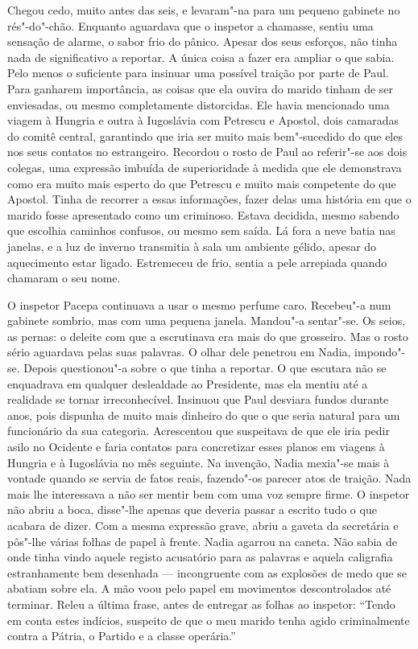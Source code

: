 Chegou cedo, muito antes das seis, e levaram"-na para um pequeno gabinete
no rés"-do"-chão. Enquanto aguardava que o inspetor a chamasse, sentiu
uma sensação de alarme, o sabor frio do pânico. Apesar dos seus
esforços, não tinha nada de significativo a reportar. A única coisa a
fazer era ampliar o que sabia. Pelo menos o suficiente para insinuar uma
possível traição por parte de Paul. Para ganharem importância, as coisas
que ela ouvira do marido tinham de ser enviesadas, ou mesmo
completamente distorcidas. Ele havia mencionado uma viagem à Hungria e
outra à Iugoslávia com Petrescu e Apostol, dois camaradas do comitê
central, garantindo que iria ser muito mais
bem"-sucedido do que eles nos seus contatos no estrangeiro. Recordou o
rosto de Paul ao referir"-se aos dois colegas, uma expressão imbuída de
superioridade à medida que ele demonstrava como era muito mais esperto
do que Petrescu e muito mais competente do que Apostol. Tinha de
recorrer a essas informações, fazer delas uma história em que o marido
fosse apresentado como um criminoso. Estava decidida, mesmo sabendo que
escolhia caminhos confusos, ou mesmo sem saída. Lá fora a neve batia nas
janelas, e a luz de inverno transmitia à sala um ambiente gélido, apesar
do aquecimento estar ligado. Estremeceu de frio, sentia a pele arrepiada
quando chamaram o seu nome.

O inspetor Pacepa continuava a usar o mesmo perfume caro. Recebeu"-a num gabinete sombrio, mas com uma pequena janela.
Mandou"-a sentar"-se. Os seios, as pernas: o deleite com que a escrutinava
era mais do que grosseiro. Mas o rosto sério aguardava pelas suas
palavras. O olhar dele penetrou em Nadia, impondo"-se. Depois
questionou"-a sobre o que tinha a reportar. O que escutara não se
enquadrava em qualquer deslealdade ao Presidente, mas ela mentiu até a
realidade se tornar irreconhecível. Insinuou que Paul desviara fundos
durante anos, pois dispunha de muito mais dinheiro do que o que seria
natural para um funcionário da sua categoria. Acrescentou que
suspeitava de que ele iria pedir asilo no Ocidente e faria contatos
para concretizar esses planos em viagens à Hungria e à Iugoslávia no
mês seguinte. Na invenção, Nadia mexia"-se mais à vontade quando se
servia de fatos reais, fazendo"-os parecer atos de traição. Nada mais
lhe interessava a não ser mentir bem com uma voz sempre firme. O inspetor não
abriu a boca, disse"-lhe apenas que deveria passar a escrito tudo o que
acabara de dizer. Com a mesma expressão grave, abriu a gaveta da
secretária e pôs"-lhe várias folhas de papel à frente. Nadia agarrou na
caneta. Não sabia de onde tinha vindo aquele registo acusatório para as
palavras e aquela caligrafia estranhamente bem desenhada ---
incongruente com as explosões de medo que se abatiam sobre ela. A mão
voou pelo papel em movimentos descontrolados até terminar. Releu a
última frase, antes de entregar as folhas ao inspetor:
``Tendo em conta estes indícios, suspeito de que o meu marido tenha agido
criminalmente contra a Pátria, o Partido e a classe operária.''

